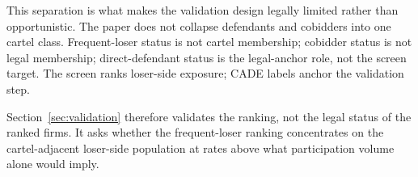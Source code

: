 This separation is what makes the validation design legally
limited rather than opportunistic. The paper does not collapse
defendants and cobidders into one cartel class. Frequent-loser
status is not cartel membership; cobidder status is not legal
membership; direct-defendant status is the legal-anchor role,
not the screen target. The screen ranks loser-side exposure;
CADE labels anchor the validation step.

Section~\ref{sec:validation} therefore validates the ranking,
not the legal status of the ranked firms. It asks whether the
frequent-loser ranking concentrates on the cartel-adjacent
loser-side population at rates above what participation volume
alone would imply.
